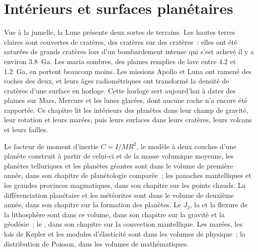\chapter{Intérieurs et surfaces planétaires}\label{ch:b3:planetary-interiors-surfaces}

Vue à la jumelle, la Lune présente deux sortes de terrains. Les hautes terres
claires sont couvertes de cratères, des cratères sur des cratères~: elles ont
été saturées de grands cratères lors d'un bombardement intense qui s'est achevé
il y a environ 3.8~Ga. Les maria sombres, des plaines remplies de lave entre 4.2 et
1.2~Ga, en portent beaucoup moins. Les missions Apollo et Luna ont
ramené des roches des deux, et leurs âges radiométriques ont transformé la
densité de cratères d'une surface en horloge. Cette horloge sert aujourd'hui
à dater des plaines sur Mars, Mercure et les lunes glacées, dont aucune roche
n'a encore été rapportée. Ce chapitre lit les intérieurs des planètes dans leur
champ de gravité, leur rotation et leurs marées, puis leurs surfaces dans leurs
cratères, leurs volcans et leurs failles.

\begin{recall}
Le facteur de moment d'inertie $C = I/MR^2$, le modèle à deux couches d'une
planète construit à partir de celui-ci et de la masse volumique moyenne, les
planètes telluriques et les planètes géantes sont dans le volume de première
année, dans son chapitre de planétologie comparée~; les panaches mantelliques et
les grandes provinces magmatiques, dans son chapitre sur les points chauds. La différenciation planétaire et les météorites sont dans le volume de deuxième
année, dans son chapitre sur la formation des planètes. Le 
$J_2$, la  et la flexure de la lithosphère sont dans ce
volume, dans son chapitre sur la gravité et la géodésie~; le , dans son
chapitre sur la convection mantellique. Les marées, les lois de Kepler et les modules
d'élasticité sont dans les volumes de physique~; la distribution de Poisson, dans les
volumes de mathématiques.
\end{recall}

